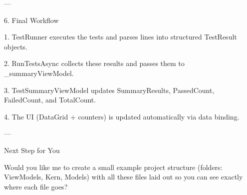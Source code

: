 ---

6. Final Workflow

1. TestRunner executes the tests and parses lines into structured TestResult objects.


2. RunTestsAsync collects these results and passes them to _summaryViewModel.


3. TestSummaryViewModel updates SummaryResults, PassedCount, FailedCount, and TotalCount.


4. The UI (DataGrid + counters) is updated automatically via data binding.




---

Next Step for You

Would you like me to create a small example project structure (folders: ViewModels, Kern, Models) with all these files laid out so you can see exactly where each file goes?


